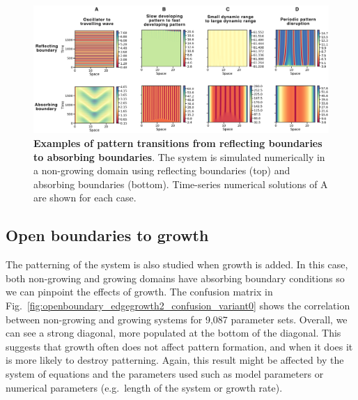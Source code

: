\begin{figure}[H] %
    \centering
    \begin{adjustbox}{center}
        \includegraphics[width=1\textwidth]{chapters/Chapter 1/interesting_cases_openboundary} %
    \end{adjustbox}
    \caption{\textbf{Examples of pattern transitions from reflecting boundaries to absorbing boundaries}. The system is simulated numerically in a non-growing domain using reflecting boundaries (top) and absorbing boundaries (bottom). Time-series numerical solutions of A are shown for each case.}
    \label{fig:interesting_cases_openboundary}
\end{figure}

\subsection{Open boundaries to growth}
The patterning of the system is also studied when growth is added.
In this case, both non-growing and growing domains have absorbing boundary conditions so we can pinpoint the effects of growth.
The confusion matrix in Fig.~\ref{fig:openboundary_edgegrowth2_confusion_variant0} shows the correlation between non-growing and growing systems for 9,087 parameter sets.
Overall, we can see a strong diagonal, more populated at the bottom of the diagonal.
This suggests that growth often does not affect pattern formation, and when it does it is more likely to destroy patterning.
Again, this result might be affected by the system of equations and the parameters used such as model parameters or numerical parameters (e.g.~length of the system or growth rate).

